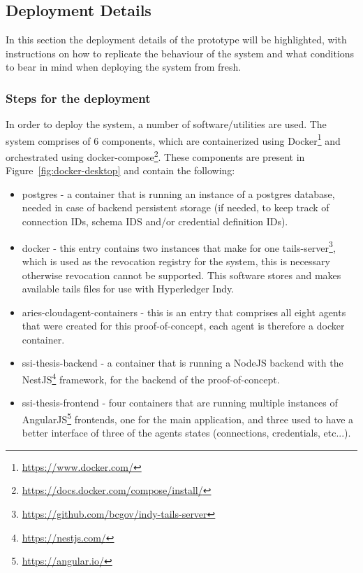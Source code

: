 \subsection{Deployment Details}
\label{subsec:deployment_details}

In this section the deployment details of the prototype will be highlighted, with instructions on how to replicate the behaviour of the system and what conditions to bear in mind when deploying the system from fresh. 

\subsubsection{Steps for the deployment}
\label{subsubsec:steps_for_the_deployment}

In order to deploy the system, a number of software/utilities are used. The system comprises of 6 components, which are containerized using Docker\footnote{\url{https://www.docker.com/}} and orchestrated using docker-compose\footnote{\url{https://docs.docker.com/compose/install/}}. These components are present in Figure~\ref{fig:docker-desktop} and contain the following:

\begin{itemize}
    \item postgres - a container that is running an instance of a postgres database, needed in case of backend persistent storage (if needed, to keep track of connection IDs, schema IDS and/or credential definition IDs).
    \item docker - this entry contains two instances that make for one tails-server\footnote{\url{https://github.com/bcgov/indy-tails-server}}, which is used as the revocation registry for the system, this is necessary otherwise revocation cannot be supported. This software stores and makes available tails files for use with Hyperledger Indy.
    \item aries-cloudagent-containers - this is an entry that comprises all eight agents that were created for this proof-of-concept, each agent is therefore a docker container.
    \item ssi-thesis-backend - a container that is running a NodeJS backend with the NestJS\footnote{\url{https://nestjs.com/}} framework, for the backend of the proof-of-concept.
    \item ssi-thesis-frontend - four containers that are running multiple instances of AngularJS\footnote{\url{https://angular.io/}} frontends, one for the main application, and three used to have a better interface of three of the agents states (connections, credentials, etc...).
\end{itemize}

